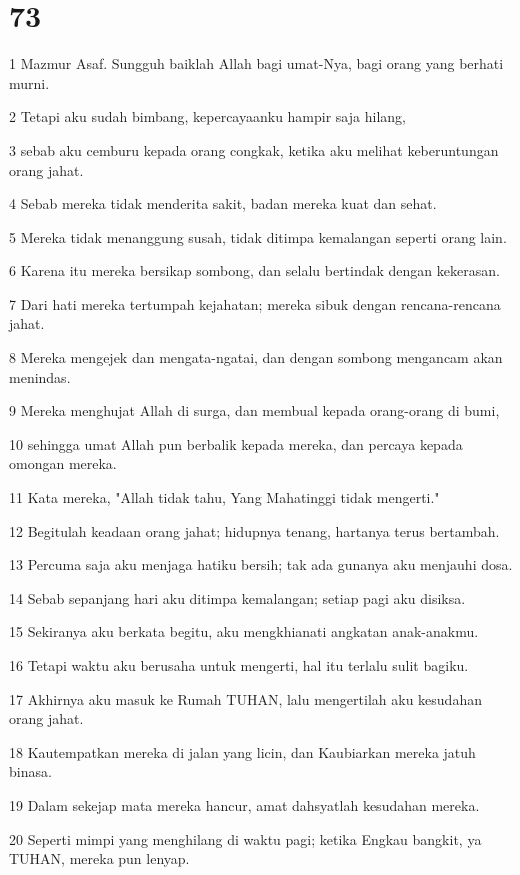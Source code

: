 \chapter{73}

\par 1 Mazmur Asaf. Sungguh baiklah Allah bagi umat-Nya, bagi orang yang berhati murni.
\par 2 Tetapi aku sudah bimbang, kepercayaanku hampir saja hilang,
\par 3 sebab aku cemburu kepada orang congkak, ketika aku melihat keberuntungan orang jahat.
\par 4 Sebab mereka tidak menderita sakit, badan mereka kuat dan sehat.
\par 5 Mereka tidak menanggung susah, tidak ditimpa kemalangan seperti orang lain.
\par 6 Karena itu mereka bersikap sombong, dan selalu bertindak dengan kekerasan.
\par 7 Dari hati mereka tertumpah kejahatan; mereka sibuk dengan rencana-rencana jahat.
\par 8 Mereka mengejek dan mengata-ngatai, dan dengan sombong mengancam akan menindas.
\par 9 Mereka menghujat Allah di surga, dan membual kepada orang-orang di bumi,
\par 10 sehingga umat Allah pun berbalik kepada mereka, dan percaya kepada omongan mereka.
\par 11 Kata mereka, "Allah tidak tahu, Yang Mahatinggi tidak mengerti."
\par 12 Begitulah keadaan orang jahat; hidupnya tenang, hartanya terus bertambah.
\par 13 Percuma saja aku menjaga hatiku bersih; tak ada gunanya aku menjauhi dosa.
\par 14 Sebab sepanjang hari aku ditimpa kemalangan; setiap pagi aku disiksa.
\par 15 Sekiranya aku berkata begitu, aku mengkhianati angkatan anak-anakmu.
\par 16 Tetapi waktu aku berusaha untuk mengerti, hal itu terlalu sulit bagiku.
\par 17 Akhirnya aku masuk ke Rumah TUHAN, lalu mengertilah aku kesudahan orang jahat.
\par 18 Kautempatkan mereka di jalan yang licin, dan Kaubiarkan mereka jatuh binasa.
\par 19 Dalam sekejap mata mereka hancur, amat dahsyatlah kesudahan mereka.
\par 20 Seperti mimpi yang menghilang di waktu pagi; ketika Engkau bangkit, ya TUHAN, mereka pun lenyap.
